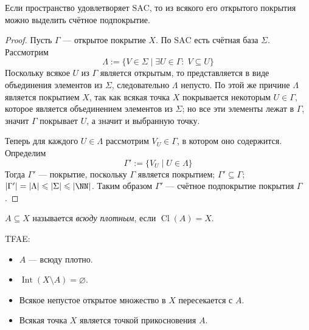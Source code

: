 \documentclass[12pt,a4paper]{article}
\DeclareMathOperator{\Int}{Int}
\DeclareMathOperator{\Cl}{Cl}
\newcommand{\SAC}{\ensuremath{\mathrm{SAC}}\xspace}
\begin{document}
    \begin{theorem}\label{countable_supcover_by_SAC_theorem}
        Если пространство удовлетворяет \SAC, то из всякого его открытого покрытия можно выделить счётное подпокрытие.
    \end{theorem}

    \begin{proof}
        Пусть $\Gamma$ --- открытое покрытие $X$. По \SAC есть счётная база $\Sigma$. Рассмотрим
        \[\Lambda := \{V \in \Sigma \mid \exists U \in \Gamma:\; V \subseteq U\}\]
        Поскольку всякое $U$ из $\Gamma$ является открытым, то представляется в виде объединения элементов из $\Sigma$, следовательно $\Lambda$ непусто. По этой же причине $\Lambda$ является покрытием $X$, так как всякая точка $X$ покрывается некоторым $U \in \Gamma$, которое является объединением элементов из $\Sigma$; но все эти элементы лежат в $\Gamma$, значит $\Gamma$ покрывает $U$, а значит и выбранную точку.

        Теперь для каждого $U \in \Lambda$ рассмотрим $V_U \in \Gamma$, в котором оно содержится. Определим
        \[\Gamma' := \{V_U \mid U \in \Lambda\}\]
        Тогда $\Gamma'$ --- покрытие, поскольку $\Gamma$ является покрытием; $\Gamma' \subseteq \Gamma$; $|\Gamma'| = |\Lambda| \leqslant |\Sigma| \leqslant |\NN|$. Таким образом $\Gamma'$ --- счётное подпокрытие покрытия $\Gamma$.
    \end{proof}

    \begin{definition}
        $A \subseteq X$ называется \emph{всюду плотным}, если $\Cl(A) = X$.
    \end{definition}

    \begin{lemma}
        TFAE:
        \begin{itemize}
            \item $A$ --- всюду плотно.
            \item $\Int(X \setminus A) = \varnothing$.
            \item Всякое непустое открытое множество в $X$ пересекается с $A$.
            \item Всякая точка $X$ является точкой прикосновения $A$.
        \end{itemize}
    \end{lemma}
\end{document}
